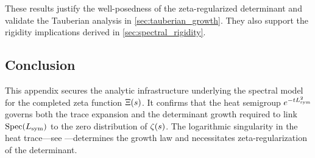 These results justify the well-posedness of the zeta-regularized determinant and validate the Tauberian analysis in \cref{sec:tauberian_growth}. They also support the rigidity implications derived in \cref{sec:spectral_rigidity}.

\subsection*{Conclusion}

This appendix secures the analytic infrastructure underlying the spectral model for the completed zeta function \( \Xi(s) \). It confirms that the heat semigroup \( e^{-t L_{\mathrm{sym}}^2} \) governs both the trace expansion and the determinant growth required to link \( \operatorname{Spec}(L_{\mathrm{sym}}) \) to the zero distribution of \( \zeta(s) \). The logarithmic singularity in the heat trace—see —determines the growth law and necessitates zeta-regularization of the determinant.
